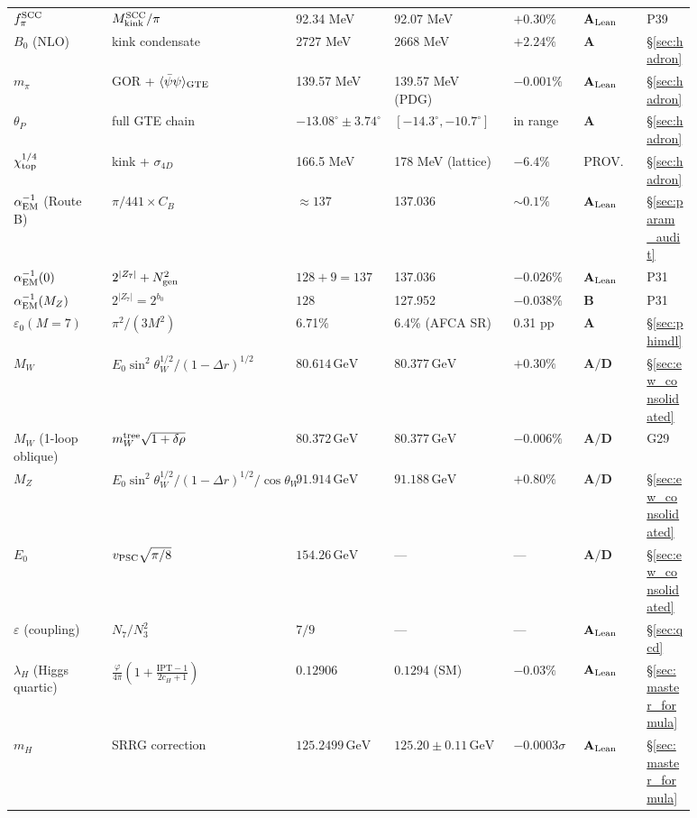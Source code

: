 \documentclass[11pt]{article}
\theoremstyle{remark}
\newcommand{\Ngen}{N_{\rm gen}}
\newcommand{\sinwsq}{\sin^2\!\theta_W}
\newcommand{\epszero}{\varepsilon_0}
\newcommand{\CatA}{\textbf{A}}
\newcommand{\CatAL}{\ensuremath{\textbf{A}_{\rm Lean}}}
\newcommand{\CatAD}{\textbf{A/D}}
\newcommand{\CatB}{\textbf{B}}
\begin{document}
\begin{appendices}
\begin{longtable}{@{}P{0.14\linewidth}P{0.17\linewidth}P{0.14\linewidth}P{0.17\linewidth}P{0.10\linewidth}P{0.09\linewidth}P{0.07\linewidth}@{}}
$f_\pi^{\rm SCC}$ & $M_{\rm kink}^{\rm SCC}/\pi$ & 92.34 MeV & 92.07 MeV & $+0.30\%$ & $\CatAL$ & P39 \\
$B_0$ (NLO) & kink condensate & 2727 MeV & 2668 MeV & $+2.24\%$ & $\CatA$ & \S\ref{sec:hadron} \\
$m_\pi$ & GOR + $\langle\bar\psi\psi\rangle_{\rm GTE}$ & 139.57 MeV & 139.57 MeV (PDG) & $-0.001\%$ & $\CatAL$ & \S\ref{sec:hadron} \\
$\theta_P$ & full GTE chain & $-13.08^\circ \pm 3.74^\circ$ & $[-14.3^\circ,-10.7^\circ]$ & in range & $\CatA$ & \S\ref{sec:hadron} \\
$\chi_{\rm top}^{1/4}$ & kink + $\sigma_{4D}$ & 166.5 MeV & 178 MeV (lattice) & $-6.4\%$ & PROV. & \S\ref{sec:hadron} \\
$\alpha_{\rm EM}^{-1}$ (Route B) & $\pi/441 \times C_B$ & $\approx 137$ & 137.036 & $\sim 0.1\%$ & $\CatAL$ & \S\ref{sec:param_audit} \\
$\alpha_{\rm EM}^{-1}(0)$ & $2^{|Z_7|} + \Ngen^2$ & $128 + 9 = 137$ & 137.036 & $-0.026\%$ & $\CatAL$ & P31 \\
$\alpha_{\rm EM}^{-1}(M_Z)$ & $2^{|Z_7|} = 2^{b_0}$ & $128$ & 127.952 & $-0.038\%$ & $\CatB$ & P31 \\
$\epszero(M{=}7)$ & $\pi^2/(3M^2)$ & 6.71\% & 6.4\% (AFCA SR) & 0.31 pp & $\CatA$ & \S\ref{sec:phimdl} \\
$M_W$ & $E_0\sinwsq^{1/2}/(1-\Delta r)^{1/2}$ & $80.614\,\text{GeV}$ & $80.377\,\text{GeV}$ & $+0.30\%$ & $\CatAD$ & \S\ref{sec:ew_consolidated} \\
$M_W$ (1-loop oblique) & $m_W^{\rm tree}\sqrt{1+\delta\rho}$ & $80.372\,\text{GeV}$ & $80.377\,\text{GeV}$ & $-0.006\%$ & $\CatAD$ & G29 \\
$M_Z$ & $E_0\sinwsq^{1/2}/(1-\Delta r)^{1/2}/\cos\theta_W$ & $91.914\,\text{GeV}$ & $91.188\,\text{GeV}$ & $+0.80\%$ & $\CatAD$ & \S\ref{sec:ew_consolidated} \\
$E_0$ & $v_{\rm PSC}\sqrt{\pi/8}$ & $154.26\,\text{GeV}$ & --- & --- & $\CatAD$ & \S\ref{sec:ew_consolidated} \\
$\varepsilon$ (coupling) & $N_7/N_3^2$ & $7/9$ & --- & --- & $\CatAL$ & \S\ref{sec:qcd} \\
$\lambda_H$ (Higgs quartic) & $\frac{\varphi}{4\pi}(1+\frac{\mathrm{IPT}-1}{2c_H+1})$ & $0.12906$ & $0.1294$ (SM) & $-0.03\%$ & $\CatAL$ & \S\ref{sec:master_formula} \\
$m_H$ & SRRG correction & $125.2499\,\text{GeV}$ & $125.20\pm0.11\,\text{GeV}$ & $-0.0003\sigma$ & $\CatAL$ & \S\ref{sec:master_formula} \\

\end{longtable}
\end{appendices}
\end{document}
